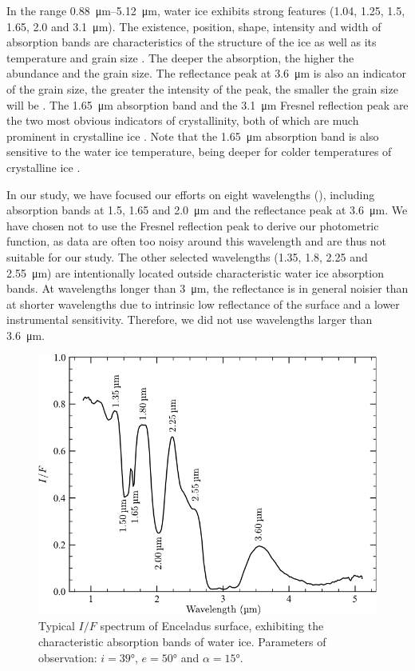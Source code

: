 \documentclass{arxiv-icarus}
\begin{document}
In the range \SIrange{0.88}{5.12}{\um}, water ice exhibits strong features (\num{1.04}, \num{1.25}, \num{1.5}, \num{1.65}, \num{2.0} and \SI{3.1}{\um}). The existence, position, shape, intensity and width of absorption bands are characteristics of the structure of the ice as well as its temperature and grain size \citep{Fink1975, Clark1984, Brown2006, Newman2008, Clark2013, Scipioni2017}. The deeper the absorption, the higher the abundance and the grain size. The reflectance peak at \SI{3.6}{\um} is also an indicator of the grain size, the greater the intensity of the peak, the smaller the grain size will be \citep{Hansen2004, Filacchione2012}. The \SI{1.65}{\um} absorption band and the \SI{3.1}{\um} Fresnel reflection peak are the two most obvious indicators of crystallinity, both of which are much prominent in crystalline ice \citep{Schmitt1998, Brown2006, Newman2008}. Note that the \SI{1.65}{\um} absorption band is also sensitive to the water ice temperature, being deeper for colder temperatures of crystalline ice \citep{Grundy1998, Grundy1999}.

In our study, we have focused our efforts on eight wavelengths (), including absorption bands at \num{1.5}, \num{1.65} and \SI{2.0}{\um} and the reflectance peak at \SI{3.6}{\um}. We have chosen not to use the Fresnel reflection peak to derive our photometric function, as data are often too noisy around this wavelength and are thus not suitable for our study. The other selected wavelengths (\ie \num{1.35}, \num{1.8}, \num{2.25} and \SI{2.55}{\um}) are intentionally located outside characteristic water ice absorption bands. At wavelengths longer than \SI{3}{\um}, the reflectance is in general noisier than at shorter wavelengths due to intrinsic low reflectance of the surface and a lower instrumental sensitivity. Therefore, we did not use wavelengths larger than \SI{3.6}{\um}.

\begin{figure}[!ht]
    \includegraphics[width=.9\linewidth]{Fig_3}
    \caption{Typical $I/F$ spectrum of Enceladus surface, exhibiting the characteristic absorption bands of water ice. Parameters of observation: $i = \ang{39}$, $e = \ang{50}$ and $\alpha = \ang{15}$.}
    \label{fig:fig_3}
\end{figure}
\end{document}
